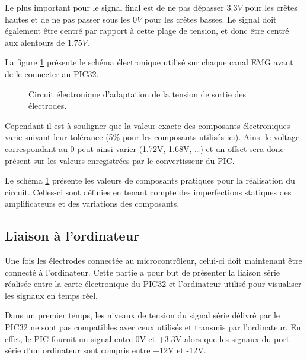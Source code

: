 \documentclass[letterpaper, twoside, 12pt, memoire, creativecommons, hyperref]{thETS}
\begin{document}
Le plus important pour le signal final est de ne pas dépasser $3.3V$ pour les crêtes hautes et de ne pas passer sous les $0V$ pour les crêtes basses. Le signal doit également être centré par rapport à cette plage de tension, et donc être centré aux alentours de $1.75V$.

La figure \ref{fig:adapttension} présente le schéma électronique utilisé sur chaque canal EMG avant de le connecter au PIC32.

\begin{figure}
	\centering
	\caption{Circuit électronique d'adaptation de la tension de sortie des électrodes.}
	\label{fig:adapttension}
\end{figure}

Cependant il est à souligner que la valeur exacte des composants électroniques varie suivant leur tolérance (5\% pour les composants utilisés ici). Ainsi le voltage correspondant au 0 peut ainsi varier (1.72V, 1.68V, …) et un offset sera donc présent sur les valeurs enregistrées par le convertisseur du PIC. 

Le schéma \ref{fig:adapttension} présente les valeurs de composants pratiques pour la réalisation du circuit. Celles-ci sont définies en tenant compte des imperfections statiques des amplificateurs et des variations des composants.


\subsection{Liaison à l'ordinateur}

Une fois les électrodes connectée au microcontrôleur, celui-ci doit maintenant être connecté à l'ordinateur. Cette partie a pour but de présenter la liaison série réalisée entre la carte électronique du PIC32 et l'ordinateur utilisé pour visualiser les signaux en temps réel.

Dans un premier temps, les niveaux de tension du signal série délivré par le PIC32 ne sont pas compatibles avec ceux utilisés et transmis par l'ordinateur. En effet, le PIC fournit un signal entre 0V et +3.3V alors que les signaux du port série d'un ordinateur sont compris entre +12V et -12V. 
\end{document}
